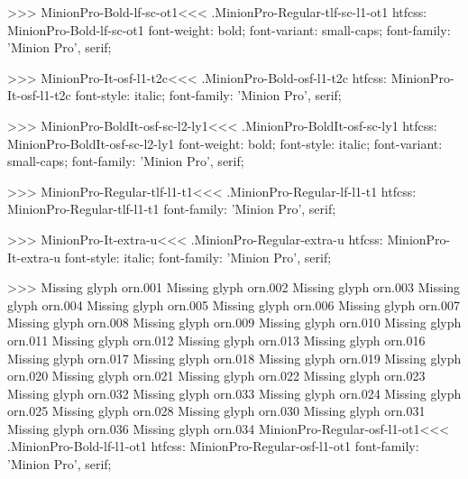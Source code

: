 {>>>
\<MinionPro-Bold-lf-sc-ot1\><<<
.MinionPro-Regular-tlf-sc-l1-ot1
htfcss:  MinionPro-Bold-lf-sc-ot1  font-weight: bold; font-variant: small-caps; font-family: 'Minion Pro', serif;

>>>
\<MinionPro-It-osf-l1-t2c\><<<
.MinionPro-Bold-osf-l1-t2c
htfcss:  MinionPro-It-osf-l1-t2c  font-style: italic; font-family: 'Minion Pro', serif;

>>>
\<MinionPro-BoldIt-osf-sc-l2-ly1\><<<
.MinionPro-BoldIt-osf-sc-ly1
htfcss:  MinionPro-BoldIt-osf-sc-l2-ly1  font-weight: bold; font-style: italic; font-variant: small-caps; font-family: 'Minion Pro', serif;

>>>
\<MinionPro-Regular-tlf-l1-t1\><<<
.MinionPro-Regular-lf-l1-t1
htfcss:  MinionPro-Regular-tlf-l1-t1  font-family: 'Minion Pro', serif;

>>>
\<MinionPro-It-extra-u\><<<
.MinionPro-Regular-extra-u
htfcss:  MinionPro-It-extra-u  font-style: italic; font-family: 'Minion Pro', serif;

>>>
Missing glyph	orn.001
Missing glyph	orn.002
Missing glyph	orn.003
Missing glyph	orn.004
Missing glyph	orn.005
Missing glyph	orn.006
Missing glyph	orn.007
Missing glyph	orn.008
Missing glyph	orn.009
Missing glyph	orn.010
Missing glyph	orn.011
Missing glyph	orn.012
Missing glyph	orn.013
Missing glyph	orn.016
Missing glyph	orn.017
Missing glyph	orn.018
Missing glyph	orn.019
Missing glyph	orn.020
Missing glyph	orn.021
Missing glyph	orn.022
Missing glyph	orn.023
Missing glyph	orn.032
Missing glyph	orn.033
Missing glyph	orn.024
Missing glyph	orn.025
Missing glyph	orn.028
Missing glyph	orn.030
Missing glyph	orn.031
Missing glyph	orn.036
Missing glyph	orn.034
\<MinionPro-Regular-osf-l1-ot1\><<<
.MinionPro-Bold-lf-l1-ot1
htfcss:  MinionPro-Regular-osf-l1-ot1  font-family: 'Minion Pro', serif;

}
